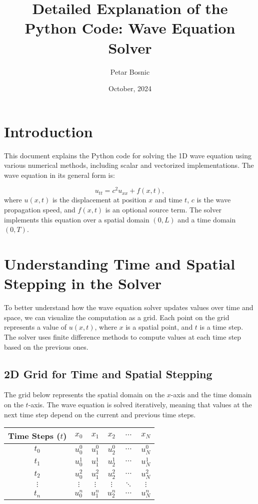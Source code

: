 \documentclass[a4paper, 11pt]{article}
\title{Detailed Explanation of the Python Code: Wave Equation Solver}
\author{Petar Bosnic}
\date{October, 2024}
\begin{document}
	
	\maketitle
	
	\section{Introduction}
	
	This document explains the Python code for solving the 1D wave equation using various numerical methods, including scalar and vectorized implementations. The wave equation in its general form is:
	
	\begin{equation}
		u_{tt} = c^2 u_{xx} + f(x,t),
	\end{equation}
	where $u(x,t)$ is the displacement at position $x$ and time $t$, $c$ is the wave propagation speed, and $f(x,t)$ is an optional source term. The solver implements this equation over a spatial domain $(0, L)$ and a time domain $(0, T)$.
	
	
	\section{Understanding Time and Spatial Stepping in the Solver}
	
	To better understand how the wave equation solver updates values over time and space, we can visualize the computation as a grid. Each point on the grid represents a value of $u(x, t)$, where $x$ is a spatial point, and $t$ is a time step. The solver uses finite difference methods to compute values at each time step based on the previous ones.
	
	\subsection{2D Grid for Time and Spatial Stepping}
	
	The grid below represents the spatial domain on the $x$-axis and the time domain on the $t$-axis. The wave equation is solved iteratively, meaning that values at the next time step depend on the current and previous time steps.
	
	\begin{center}
		\begin{tabular}{|c|c|c|c|c|c|}
			\hline
			\textbf{Time Steps ($t$)} & \textbf{$x_0$} & \textbf{$x_1$} & \textbf{$x_2$} & \textbf{$\cdots$} & \textbf{$x_N$} \\
			\hline
			$t_0$ & $u_0^0$ & $u_1^0$ & $u_2^0$ & $\cdots$ & $u_N^0$ \\
			\hline
			$t_1$ & $u_0^1$ & $u_1^1$ & $u_2^1$ & $\cdots$ & $u_N^1$ \\
			\hline
			$t_2$ & $u_0^2$ & $u_1^2$ & $u_2^2$ & $\cdots$ & $u_N^2$ \\
			\hline
			$\vdots$ & $\vdots$ & $\vdots$ & $\vdots$ & $\ddots$ & $\vdots$ \\
			\hline
			$t_n$ & $u_0^n$ & $u_1^n$ & $u_2^n$ & $\cdots$ & $u_N^n$ \\
			\hline
		\end{tabular}
	\end{center}
	
\end{document}
